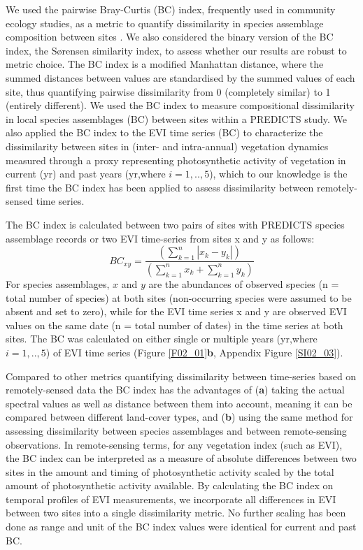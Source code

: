 We used the pairwise Bray-Curtis (BC) index, frequently used in community ecology studies, as a metric to quantify dissimilarity in species assemblage composition between sites \citep{Bray1957,Faith1987,Su2004}. We also considered the binary version of the BC index, the S\o rensen similarity index, to assess whether our results are robust to metric choice. The BC index is a modified Manhattan distance, where the summed distances between values are standardised by the summed values of each site, thus quantifying pairwise dissimilarity from 0 (completely similar) to 1 (entirely different). We used the BC index to measure compositional dissimilarity in local species assemblages (BC) between sites within a PREDICTS study. We also applied the BC index to the EVI time series (BC) to characterize the dissimilarity between sites in (inter- and intra-annual) vegetation dynamics measured through a proxy representing photosynthetic activity of vegetation in current (yr) and past years (yr,where $i = 1,..,5$), which to our knowledge is the first time the BC index has been applied to assess dissimilarity between remotely-sensed time series.

The BC index is calculated between two pairs of sites with PREDICTS species assemblage records or two EVI time-series from sites x and y as follows: 
\begin{equation*}
    BC_{xy} = \frac{( \sum_{k=1}^{n} |x_k - y_k  | )}{ (\sum_{k=1}^{n} x_k + \sum_{k=1}^{n} y_k )}
\end{equation*}
For species assemblages, $x$ and $y$ are the abundances of observed species (n = total number of species) at both sites (non-occurring species were assumed to be absent and set to zero), while for the EVI time series x and y are observed EVI values on the same date (n = total number of dates) in the time series at both sites. The BC was calculated on either single or multiple years (yr,where $i = 1,..,5$) of EVI time series (Figure \ref{F02_01}\textbf{b}, Appendix Figure \ref{SI02_03}).

Compared to other metrics quantifying dissimilarity between time-series based on remotely-sensed data \citep{Lhermitte2011} the BC index has the advantages of (\textbf{a}) taking the actual spectral values as well as distance between them into account, meaning it can be compared between different land-cover types, and (\textbf{b}) using the same method for assessing dissimilarity between species assemblages and between remote-sensing observations. In remote-sensing terms, for any vegetation index (such as EVI), the BC index can be interpreted as a measure of absolute differences between two sites in the amount and timing of photosynthetic activity scaled by the total amount of photosynthetic activity available. By calculating the BC index on temporal profiles of EVI measurements, we incorporate all differences in EVI between two sites into a single dissimilarity metric. No further scaling has been done as range and unit of the BC index values were identical for current and past BC.

